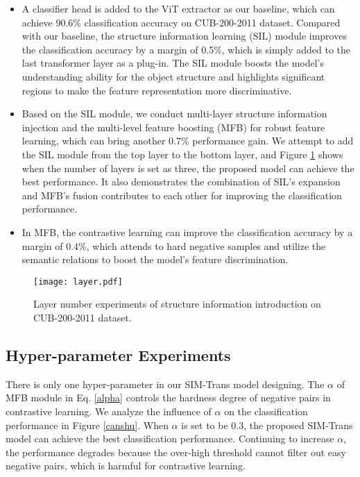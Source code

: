 \documentclass[sigconf, nonacm]{acmart}
\begin{document}
\begin{itemize}[leftmargin=30pt]
\item {A classifier head is added to the ViT extractor as our baseline, which can achieve 90.6\% classification accuracy on CUB-200-2011 dataset. Compared with our baseline, the structure information learning (SIL) module improves the classification accuracy by a margin of 0.5\%, which is simply added to the last transformer layer as a plug-in. The SIL module boosts the model’s understanding ability for the object structure and highlights significant regions to make the feature representation more discriminative.
}

\item {Based on the SIL module, we conduct multi-layer structure information injection and the multi-level feature boosting (MFB) for robust feature learning, which can bring another 0.7\% performance gain. We attempt to add the SIL module from the top layer to the bottom layer, and Figure \ref{layer} shows when the number of layers is set as three, the proposed model can achieve the best performance. It also demonstrates the combination of SIL’s expansion and MFB’s fusion contributes to each other for improving the classification performance.
}
\item {In MFB, the contrastive learning can improve the classification accuracy by a margin of 0.4\%, which attends to hard negative samples and utilize the semantic relations to boost the model's feature discrimination.}


\end{itemize}





\begin{figure}[!t]
  \centering
  \texttt{[image: layer.pdf]}
  \caption{Layer number experiments of structure information introduction on CUB-200-2011 dataset.}
  \label{layer}
\end{figure}












\subsection{Hyper-parameter Experiments}


There is only one hyper-parameter in our SIM-Trans model designing. The $\alpha $ of MFB module in Eq. \ref{alpha} controls the hardness degree of negative pairs in contrastive learning. We analyze the influence of $\alpha $ on the classification performance in Figure \ref{canshu}. When $\alpha $ is set to be 0.3, the proposed SIM-Trans model can achieve the best classification performance. Continuing to increase $\alpha $, the performance degrades because the over-high threshold cannot filter out easy negative pairs, which is harmful for contrastive learning.
\end{document}
